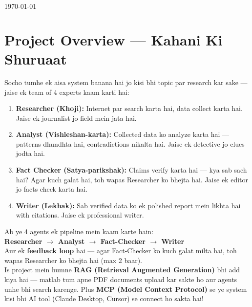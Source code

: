 \documentclass[12pt, a4paper]{article}
\begin{document}
\begin{titlepage}
\begin{center}
\vfill
{\color{comment}\today}
\end{center}
\end{titlepage}

\tableofcontents
\newpage

\section{Project Overview --- Kahani Ki Shuruaat}

\begin{storybox}
Socho tumhe ek aisa system banana hai jo kisi bhi topic par research kar sake --- jaise ek team of 4 experts kaam karti hai:

\begin{enumerate}[label=\textcolor{accentpurple}{\arabic*.}]
\item \textbf{Researcher (Khoji):} Internet par search karta hai, data collect karta hai. Jaise ek journalist jo field mein jata hai.
\item \textbf{Analyst (Vishleshan-karta):} Collected data ko analyze karta hai --- patterns dhundhta hai, contradictions nikalta hai. Jaise ek detective jo clues jodta hai.
\item \textbf{Fact Checker (Satya-parikshak):} Claims verify karta hai --- kya sab sach hai? Agar kuch galat hai, toh wapas Researcher ko bhejta hai. Jaise ek editor jo facts check karta hai.
\item \textbf{Writer (Lekhak):} Sab verified data ko ek polished report mein likhta hai with citations. Jaise ek professional writer.
\end{enumerate}

Ab ye 4 agents ek pipeline mein kaam karte hain: \\
\textbf{Researcher $\rightarrow$ Analyst $\rightarrow$ Fact-Checker $\rightarrow$ Writer} \\
Aur ek \textbf{feedback loop} hai --- agar Fact-Checker ko kuch galat milta hai, toh wapas Researcher ko bhejta hai (max 2 baar). \\[6pt]
Is project mein humne \textbf{RAG (Retrieval Augmented Generation)} bhi add kiya hai --- matlab tum apne PDF documents upload kar sakte ho aur agents unhe bhi search karenge. Plus \textbf{MCP (Model Context Protocol)} se ye system kisi bhi AI tool (Claude Desktop, Cursor) se connect ho sakta hai!
\end{storybox}
\end{document}
